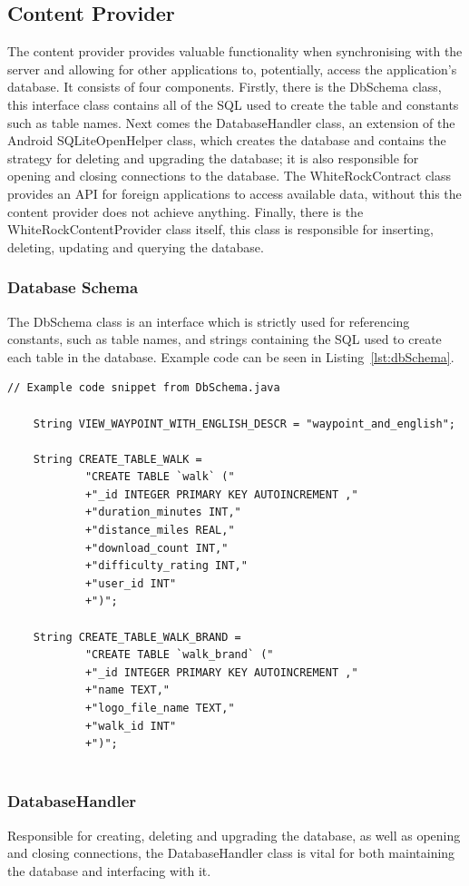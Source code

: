 \documentclass[11pt,a4paper]{article}
\begin{document}
\subsection{Content Provider}
\label{sec:contentprovier}
The content provider provides valuable functionality when synchronising with the server and allowing for other applications to, potentially, access the application's database. It consists of four components. Firstly, there is the DbSchema class, this interface class contains all of the SQL used to create the table and constants such as table names. Next comes the DatabaseHandler class, an extension of the Android SQLiteOpenHelper class, which creates the database and contains the strategy for deleting and upgrading the database; it is also responsible for opening and closing connections to the database. The WhiteRockContract class provides an API for foreign applications to access available data, without this the content provider does not achieve anything. Finally, there is the WhiteRockContentProvider class itself, this class is responsible for inserting, deleting, updating and querying the database.

\subsubsection{Database Schema}
The DbSchema class is an interface which is strictly used for referencing constants, such as table names, and strings containing the SQL used to create each table in the database. Example code can be seen in Listing~\ref{lst:dbSchema}.

\begin{lstlisting}[captionpos=b, caption=DbSchema Snippet, label=lst:dbSchema, frame=single]
	// Example code snippet from DbSchema.java
	
	String VIEW_WAYPOINT_WITH_ENGLISH_DESCR = "waypoint_and_english";
	
	String CREATE_TABLE_WALK = 
			"CREATE TABLE `walk` (" 
			+"_id INTEGER PRIMARY KEY AUTOINCREMENT ,"
			+"duration_minutes INT,"
			+"distance_miles REAL,"
			+"download_count INT,"
			+"difficulty_rating INT,"
			+"user_id INT"
			+")";
	
	String CREATE_TABLE_WALK_BRAND = 
			"CREATE TABLE `walk_brand` ("
			+"_id INTEGER PRIMARY KEY AUTOINCREMENT ,"
			+"name TEXT,"
			+"logo_file_name TEXT,"
			+"walk_id INT"
			+")";
			
\end{lstlisting}

\subsubsection{DatabaseHandler}
Responsible for creating, deleting and upgrading the database, as well as opening and closing connections, the DatabaseHandler class is vital for both maintaining the database and interfacing with it.
\end{document}
